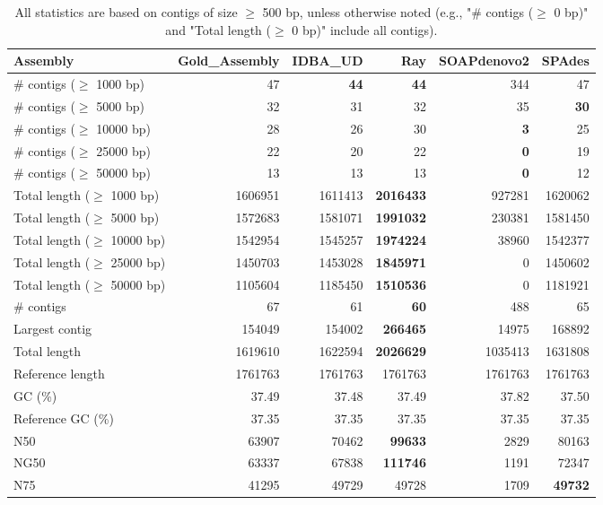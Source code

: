 \documentclass[12pt,a4paper]{article}
\begin{document}
\begin{table}[ht]
\begin{center}
\caption{All statistics are based on contigs of size $\geq$ 500 bp, unless otherwise noted (e.g., "\# contigs ($\geq$ 0 bp)" and "Total length ($\geq$ 0 bp)" include all contigs).}
\begin{tabular}{|l*{5}{|r}|}
\hline
Assembly & Gold\_Assembly & IDBA\_UD & Ray & SOAPdenovo2 & SPAdes \\ \hline
\# contigs ($\geq$ 1000 bp) & 47 & {\bf 44} & {\bf 44} & 344 & 47 \\ \hline
\# contigs ($\geq$ 5000 bp) & 32 & 31 & 32 & 35 & {\bf 30} \\ \hline
\# contigs ($\geq$ 10000 bp) & 28 & 26 & 30 & {\bf 3} & 25 \\ \hline
\# contigs ($\geq$ 25000 bp) & 22 & 20 & 22 & {\bf 0} & 19 \\ \hline
\# contigs ($\geq$ 50000 bp) & 13 & 13 & 13 & {\bf 0} & 12 \\ \hline
Total length ($\geq$ 1000 bp) & 1606951 & 1611413 & {\bf 2016433} & 927281 & 1620062 \\ \hline
Total length ($\geq$ 5000 bp) & 1572683 & 1581071 & {\bf 1991032} & 230381 & 1581450 \\ \hline
Total length ($\geq$ 10000 bp) & 1542954 & 1545257 & {\bf 1974224} & 38960 & 1542377 \\ \hline
Total length ($\geq$ 25000 bp) & 1450703 & 1453028 & {\bf 1845971} & 0 & 1450602 \\ \hline
Total length ($\geq$ 50000 bp) & 1105604 & 1185450 & {\bf 1510536} & 0 & 1181921 \\ \hline
\# contigs & 67 & 61 & {\bf 60} & 488 & 65 \\ \hline
Largest contig & 154049 & 154002 & {\bf 266465} & 14975 & 168892 \\ \hline
Total length & 1619610 & 1622594 & {\bf 2026629} & 1035413 & 1631808 \\ \hline
Reference length & 1761763 & 1761763 & 1761763 & 1761763 & 1761763 \\ \hline
GC (\%) & 37.49 & 37.48 & 37.49 & 37.82 & 37.50 \\ \hline
Reference GC (\%) & 37.35 & 37.35 & 37.35 & 37.35 & 37.35 \\ \hline
N50 & 63907 & 70462 & {\bf 99633} & 2829 & 80163 \\ \hline
NG50 & 63337 & 67838 & {\bf 111746} & 1191 & 72347 \\ \hline
N75 & 41295 & 49729 & 49728 & 1709 & {\bf 49732} \\ \hline

\end{tabular}
\end{center}
\end{table}
\end{document}
